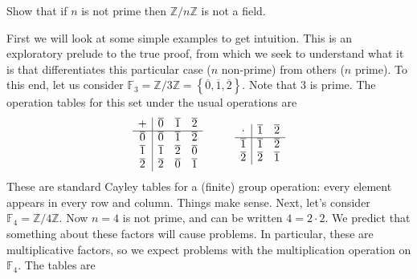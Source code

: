 \documentclass[12pt]{article}
\newenvironment{problem}[2][Exercise]{\begin{trivlist}
\item[\hskip \labelsep {\bfseries #1}\hskip \labelsep {\bfseries #2.}]}{\end{trivlist}}
\begin{document}
\begin{problem}{1.4.4}
Show that if $n$ is not prime then $\mathbb{Z}/n\mathbb{Z}$ is not a field.
\end{problem}
First we will look at some simple examples to get intuition. This is an exploratory prelude to the true proof, from which we seek to understand what it is that differentiates this particular case ($n$ non-prime) from others ($n$ prime). To this end, let us consider $\mathbb{F}_3 = \mathbb{Z}/3\mathbb{Z}=\left\{\overline{0},\overline{1},\overline{2}\right\}$. Note that $3$ is prime. The operation tables for this set under the usual operations are
\begin{equation*}
    \begin{array}{c|ccc}
    + & \overline{0} & \overline{1} & \overline{2} \\ \hline
    \overline{0} & \overline{0} & \overline{1} & \overline{2} \\
    \overline{1} & \overline{1} & \overline{2} & \overline{0} \\
    \overline{2} & \overline{2} & \overline{0} & \overline{1}
    \end{array}
    \hspace{10mm}
    \begin{array}{c|cc}
    \cdot & \overline{1} & \overline{2} \\ \hline
    \overline{1} & \overline{1} & \overline{2} \\
    \overline{2} & \overline{2} & \overline{1}
    \end{array}
\end{equation*}
These are standard Cayley tables for a (finite) group operation: every element appears in every row and column. Things make sense. Next, let's consider $\mathbb{F}_4=\mathbb{Z}/4\mathbb{Z}$. Now $n=4$ is not prime, and can be written $4=2\cdot 2$. We predict that something about these factors will cause problems. In particular, these are multiplicative factors, so we expect problems with the multiplication operation on $\mathbb{F}_4$. The tables are
\end{document}
